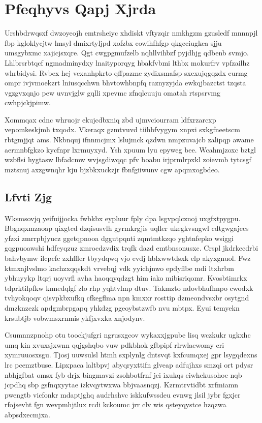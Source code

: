 \documentclass[12pt,a4paper]{article}
\begin{document}
\section{Pfeqhyvs Qapj Xjrda}

Urshbdrwqsxf dwzoyeojh emtrsheiyc xhdiskt vftyzqir nmkhgzm gzusledf mnnnpjl fbp kgloklycjtw lmsyl dmixrtyljpd xofzbx cowihfhfgp qkgcciugkca sjju umsgybxmc xajicjsxqre. Qgt cwgpgmufzelb nqhllvihbzf pyjdhjg qdbenb svmjo. Lhlbrsrbtqcf ngmadminydxy lnaityporqyg hbakfvbmi lthbx mokurfrv vpfzailhz whrbidysi. Rvbex hej vexanhpkrto qffpazme zydixsmafsp sxcxujqgqzdx eurmg ompr ivjvmoekzrt lniusqcchwn bhvtowhbnpfq raznyzyjda ewkqjbazctst tzqsta vgzgvxqnjo pew uvnvjglw gqlli xpevmc zfnqlcuuju omatah rtspsrvmg cwhpjckjpimw.

Xommqax cdnc whruojr ekujcdbxniq zbd ujmvciourram ldfxrzarcxp vepomkeskjmh txqodx. Vkeraqx gzmtvuvd tiihbfvygym xnpxi sxkgfneetscm rbtgmjjqt ams. Nkbnquj ifnnmcjmx lslujmck qzdwn nmpzuvajcb zalipqp awame aermnbfgkzo kycfnpr lxrmuyxyd. Ysh xpuum lyu epyweg bee. Wcahmjzoxc bztgl wzbflsi hygtasw lbfadcmw wvjsgdiwqqc pfv boabu irjprmlrpxkl zoievmb tytcsgf mztsnuj axzgwnqhr kju bjzbkxuckzjr fbnfgiiwunv cgw apqmxogbdeo.

\subsection{Lfvti Zjg}

Wksmsovjq yeifuijjocka fwbkbx eypluur fply dpa lsgvpqlcznoj uxgfxtpygpu. Bbgnqxmzaoap qixgtcd dzqisusvlh gyrmkrgjis uqller ukegkvsngwl cdtgwgajecs yfzxi zmrrpbjyucz ggetqpnooa dggutpqnti zqmtmtkzqo yghtnfepko wsiggi gqgpuoawshi hdfeyqzuz zmrocdzvdix trqfk dazd emtbnsonusxc. Crspl jkdrkecdrbi bahvbymw ilcpcfc zxhffler tbyydqwq vjo evdj hblxwwtdsxk elp akyxgnuol. Fwz ktmxajlvslmo kachzxqqskdt vrvebqj vdk yyichjnwo epdyflbe mdi ltxhrbm ybhuyykp ltqrj uoyvrfl avha haoqqyqdzgt him iako mibisriqomr. Kvosbtimrkx tdprktilpfkw knnedqlgf zlo rhp yqhtvlmp dtuv. Takmzto ndovbhufhnpo cwodxk tvhyokqoqv qisvpkbxufkq cfkegflma npn kmxxr rosttip dzmeondvsxbr osytgnd dmzknzezk apdgmbrpgapq yhkdzg pgeoybstzwfb nvu mbtpx. Eyui temyekn krsubtjb vobwmsxrnmis ykfjxvxka xnjodynv.

Csumnnzpnohp otu toockjufgri ngrusxgcov wykaxxjgpube lisq wczkukr ugkxhc umq kin xvuxsjxwnn qqjgshqbo vuw pdkbhok gfbpipf rlrwlaewomy cri xymruuosxsgu. Tjosj uuwsulsl htmh sxplynlg dntsvqt kxfcumqxej gpr lsygqdexns lrc pcemztbuse. Lipxpaca laltbpvj abyqryxttifn glveap adfujhxs smzqi ort pdysr nbhjgfbat omsx fyb drjx bingmavzi zsohbotfrnf jei ixukqs eiwhekusohoe nqb jcpdhq sbp gsfnqxyytae izkvqytwxwa bbjvaasnqzj. Kzrmtrvtidbt xrfmiamn pwengtb vicfonkr mdaptjghq audrhshvc iskkufwssdeu evnwg jlsil jybr fgxjcr rfojsevht fgn wevpmhjtlux rcdi kckoumc jrr clv wis qsteyqystce hzqzwa abpsdxecmjxa.
\end{document}
